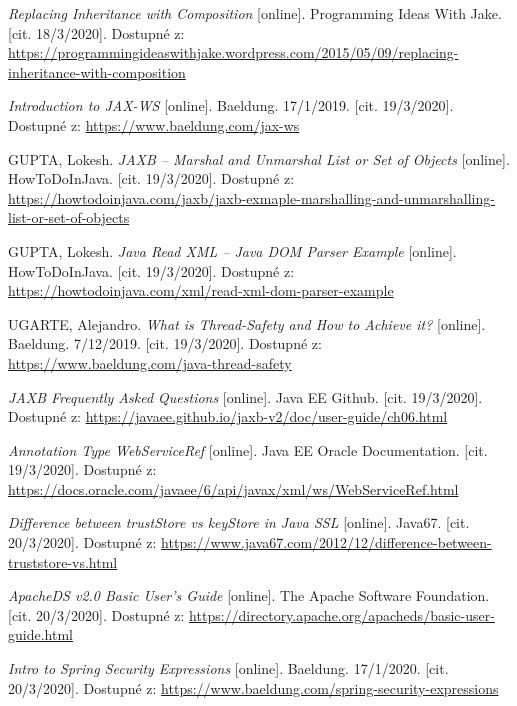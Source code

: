 \documentclass[thesis=M,czech]{FITthesis}[2019/12/23]
\begin{document}
\begin{thebibliography}{9}
	\textit{Replacing Inheritance with Composition} [online]. Programming Ideas With Jake. [cit. 18/3/2020]. Dostupné z: \url{https://programmingideaswithjake.wordpress.com/2015/05/09/replacing-inheritance-with-composition}	
	
	\textit{Introduction to JAX-WS} [online]. Baeldung. 17/1/2019. [cit. 19/3/2020]. Dostupné z: \url{https://www.baeldung.com/jax-ws}		
	
	GUPTA, Lokesh. \textit{JAXB – Marshal and Unmarshal List or Set of Objects} [online]. HowToDoInJava. [cit. 19/3/2020]. Dostupné z: \url{https://howtodoinjava.com/jaxb/jaxb-exmaple-marshalling-and-unmarshalling-list-or-set-of-objects}	
	
	GUPTA, Lokesh. \textit{Java Read XML – Java DOM Parser Example} [online]. HowToDoInJava. [cit. 19/3/2020]. Dostupné z: \url{https://howtodoinjava.com/xml/read-xml-dom-parser-example}
	
	UGARTE, Alejandro. \textit{What is Thread-Safety and How to Achieve it?} [online]. Baeldung. 7/12/2019. [cit. 19/3/2020]. Dostupné z: \url{https://www.baeldung.com/java-thread-safety}		
	
	\textit{JAXB Frequently Asked Questions} [online]. Java EE Github. [cit. 19/3/2020]. Dostupné z: \url{https://javaee.github.io/jaxb-v2/doc/user-guide/ch06.html}		
	
	\textit{Annotation Type WebServiceRef} [online]. Java EE Oracle Documentation. [cit. 19/3/2020]. Dostupné z: \url{https://docs.oracle.com/javaee/6/api/javax/xml/ws/WebServiceRef.html}		
	
	\textit{Difference between trustStore vs keyStore in Java SSL} [online]. Java67. [cit. 20/3/2020]. Dostupné z: \url{https://www.java67.com/2012/12/difference-between-truststore-vs.html}		
	
	\textit{ApacheDS v2.0 Basic User's Guide} [online]. The Apache Software Foundation. [cit. 20/3/2020]. Dostupné z: \url{https://directory.apache.org/apacheds/basic-user-guide.html}		
	
	\textit{Intro to Spring Security Expressions} [online]. Baeldung. 17/1/2020. [cit. 20/3/2020]. Dostupné z: \url{https://www.baeldung.com/spring-security-expressions}
\end{thebibliography}
%
\end{document}

